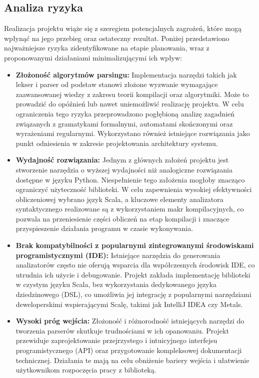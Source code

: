 \subsection{Analiza ryzyka}
\label{subsec:analiza-ryzyka}

Realizacja projektu wiąże się z szeregiem potencjalnych zagrożeń, które mogą wpłynąć na jego przebieg oraz ostateczny rezultat. Poniżej przedstawiono najważniejsze ryzyka zidentyfikowane na etapie planowania, wraz z proponowanymi działaniami minimalizującymi ich wpływ:

\begin{itemize}
    \item \textbf{Złożoność algorytmów parsingu:}
    Implementacja narzędzi takich jak lekser i parser od podstaw stanowi złożone wyzwanie wymagające zaawansowanej wiedzy z zakresu teorii kompilacji oraz algorytmiki. Może to prowadzić do opóźnień lub nawet uniemożliwić realizację projektu. W celu ograniczenia tego ryzyka przeprowadzono pogłębioną analizę zagadnień związanych z gramatykami formalnymi, automatami skończonymi oraz wyrażeniami regularnymi. Wykorzystano również istniejące rozwiązania jako punkt odniesienia w zakresie projektowania architektury systemu.
    
    \item \textbf{Wydajność rozwiązania:}
    Jednym z głównych założeń projektu jest stworzenie narzędzia o wyższej wydajności niż analogiczne rozwiązania dostępne w języku Python. Niespełnienie tego założenia mogłoby znacząco ograniczyć użyteczność biblioteki. W celu zapewnienia wysokiej efektywności obliczeniowej wybrano język Scala, a kluczowe elementy analizatora syntaktycznego realizowane są z wykorzystaniem makr kompilacyjnych, co pozwala na przeniesienie części obliczeń na etap kompilacji i znaczące przyspieszenie działania programu w czasie wykonywania.
    
    \item \textbf{Brak kompatybilności z popularnymi zintegrowanymi środowiskami programistycznymi (IDE):}
    Istniejące narzędzia do generowania analizatorów często nie oferują wsparcia dla współczesnych środowisk IDE, co utrudnia ich użycie i debugowanie. Projekt zakłada implementację biblioteki w czystym języku Scala, bez wykorzystania dedykowanego języka dziedzinowego (DSL), co umożliwia jej integrację z popularnymi narzędziami deweloperskimi wspierającymi Scalę, takimi jak IntelliJ IDEA czy Metals.
    
    \item \textbf{Wysoki próg wejścia:}
    Złożoność i różnorodność istniejących narzędzi do tworzenia parserów skutkuje trudnościami w ich opanowaniu. Projekt przewiduje zaprojektowanie przejrzystego i intuicyjnego interfejsu programistycznego (API) oraz przygotowanie kompleksowej dokumentacji technicznej. Działania te mają na celu obniżenie bariery wejścia i ułatwienie użytkownikom rozpoczęcia pracy z biblioteką.
    

\end{itemize}
